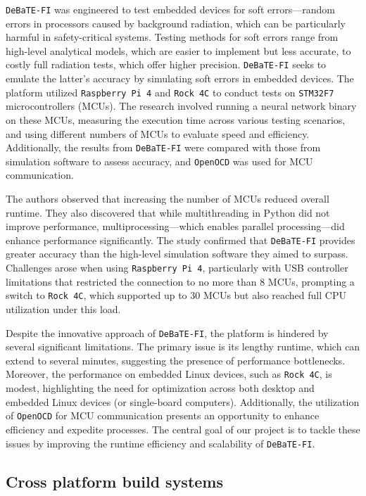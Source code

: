 \texttt{DeBaTE-FI} was engineered to test embedded devices for soft errors—random errors in processors caused by background radiation, which can be particularly harmful in safety-critical systems. Testing methods for soft errors range from high-level analytical models, which are easier to implement but less accurate, to costly full radiation tests, which offer higher precision. \texttt{DeBaTE-FI} seeks to emulate the latter's accuracy by simulating soft errors in embedded devices. The platform utilized \texttt{Raspberry Pi 4} and \texttt{Rock 4C} to conduct tests on \texttt{STM32F7} microcontrollers (MCUs). The research involved running a neural network binary on these MCUs, measuring the execution time across various testing scenarios, and using different numbers of MCUs to evaluate speed and efficiency. Additionally, the results from \texttt{DeBaTE-FI} were compared with those from simulation software to assess accuracy, and \texttt{OpenOCD} was used for MCU communication.

The authors observed that increasing the number of MCUs reduced overall runtime. They also discovered that while multithreading in Python did not improve performance, multiprocessing—which enables parallel processing—did enhance performance significantly. The study confirmed that \texttt{DeBaTE-FI} provides greater accuracy than the high-level simulation software they aimed to surpass. Challenges arose when using \texttt{Raspberry Pi 4}, particularly with USB controller limitations that restricted the connection to no more than 8 MCUs, prompting a switch to \texttt{Rock 4C}, which supported up to 30 MCUs but also reached full CPU utilization under this load.

Despite the innovative approach of \texttt{DeBaTE-FI}, the platform is hindered by several significant limitations. The primary issue is its lengthy runtime, which can extend to several minutes, suggesting the presence of performance bottlenecks. Moreover, the performance on embedded Linux devices, such as \texttt{Rock 4C}, is modest, highlighting the need for optimization across both desktop and embedded Linux devices (or single-board computers). Additionally, the utilization of \texttt{OpenOCD} for MCU communication presents an opportunity to enhance efficiency and expedite processes. The central goal of our project is to tackle these issues by improving the runtime efficiency and scalability of \texttt{DeBaTE-FI}.

\subsection{Cross platform build systems}

